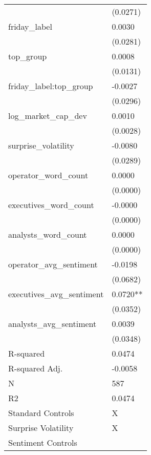 \begin{tabular}{ll}
 & (0.0271) \\
friday_label & 0.0030 \\
 & (0.0281) \\
top_group & 0.0008 \\
 & (0.0131) \\
friday_label:top_group & -0.0027 \\
 & (0.0296) \\
log_market_cap_dev & 0.0010 \\
 & (0.0028) \\
surprise_volatility & -0.0080 \\
 & (0.0289) \\
operator_word_count & 0.0000 \\
 & (0.0000) \\
executives_word_count & -0.0000 \\
 & (0.0000) \\
analysts_word_count & 0.0000 \\
 & (0.0000) \\
operator_avg_sentiment & -0.0198 \\
 & (0.0682) \\
executives_avg_sentiment & 0.0720** \\
 & (0.0352) \\
analysts_avg_sentiment & 0.0039 \\
 & (0.0348) \\
R-squared & 0.0474 \\
R-squared Adj. & -0.0058 \\
N & 587 \\
R2 & 0.0474 \\
Standard Controls & X \\
Surprise Volatility & X \\
Sentiment Controls &  \\
\bottomrule
\end{tabular}
